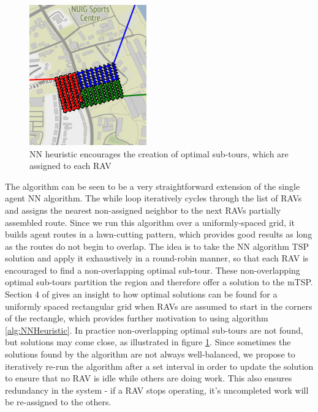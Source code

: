 \begin{figure}
\includegraphics[width=0.45\textwidth]{Chapters/MultiAgentCoverage/Figs/RAVRoutingNUIGCropped.png}
\caption{NN heuristic encourages the creation of optimal sub-tours, which are assigned to each RAV}
\label{fig:NNPartitioning}
\end{figure}
The algorithm can be seen to be a very straightforward extension of the single agent NN algorithm. The while loop iteratively cycles through the list of RAVs and assigns the nearest non-assigned neighbor to the next RAVs partially assembled route. Since we run this algorithm over a uniformly-spaced grid, it builds agent routes in a lawn-cutting pattern, which provides good results as long as the routes do not begin to overlap. The idea is to take the NN algorithm TSP solution and apply it exhaustively in a round-robin manner, so that each RAV is encouraged to find a non-overlapping optimal sub-tour. These non-overlapping optimal sub-tours partition the region and therefore offer a solution to the mTSP. Section 4 of \cite{Hungerlander2018TheGrids} gives an insight to how optimal solutions can be found for a uniformly spaced rectangular grid when RAVs are assumed to start in the corners of the rectangle, which provides further motivation to using algorithm \ref{alg:NNHeuristic}. In practice non-overlapping optimal sub-tours are not found, but solutions may come close, as illustrated in figure \ref{fig:NNPartitioning}. Since sometimes the solutions found by the algorithm are not always well-balanced, we propose to iteratively re-run the algorithm after a set interval in order to update the solution to ensure that no RAV is idle while others are doing work. This also ensures redundancy in the system - if a RAV stops operating, it's uncompleted work will be re-assigned to the others.

